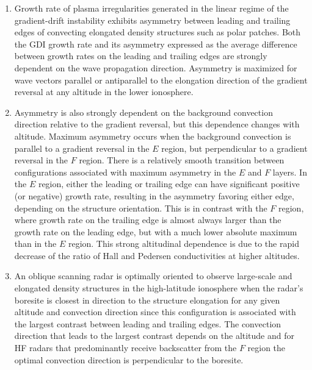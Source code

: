 \begin{enumerate}
\item Growth rate of plasma irregularities generated in the linear regime of the gradient-drift instability exhibits asymmetry between leading and trailing edges of convecting elongated density structures such as polar patches.  Both the GDI growth rate and its asymmetry expressed as the average difference between growth rates on the leading and trailing edges are strongly dependent on the wave propagation direction. Asymmetry is maximized for wave vectors parallel or antiparallel to the elongation direction of the gradient reversal at any altitude in the lower ionosphere.
\item Asymmetry is also strongly dependent on the background convection direction relative to the gradient reversal, but this dependence changes with altitude. Maximum asymmetry occurs when the background convection is parallel to a gradient reversal in the \(E\) region, but perpendicular to a gradient reversal in the \(F\) region. There is a relatively smooth transition between configurations associated with maximum asymmetry in the \(E\) and \(F\) layers. In the \(E\) region, either the leading or trailing edge can have significant positive (or negative) growth rate, resulting in the asymmetry favoring either edge, depending on the structure orientation. This is in contrast with the \(F\) region, where growth rate on the trailing edge is almost always larger than the growth rate on the leading edge, but with a much lower absolute maximum than in the \(E\) region. This strong altitudinal dependence is due to the rapid decrease of the ratio of Hall and Pedersen conductivities at higher altitudes.
\item An oblique scanning radar is optimally oriented to observe large-scale and elongated density structures in the high-latitude ionosphere when the radar's boresite is closest in direction to the structure elongation for any given altitude and convection direction since this configuration is associated with the largest contrast between leading and trailing edges. The convection direction that leads to the largest contrast depends on the altitude and for HF radars that predominantly receive backscatter from the \(F\) region the optimal convection direction is perpendicular to the boresite.
\end{enumerate}






